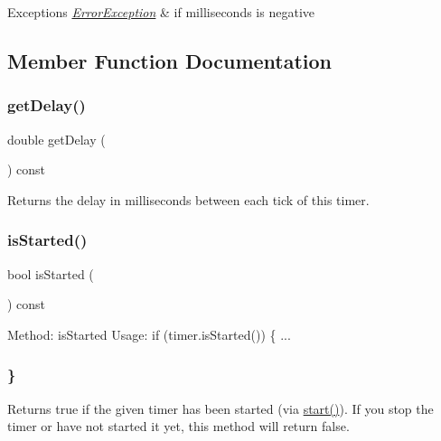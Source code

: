 \begin{DoxyExceptions}{Exceptions}
{\em \mbox{\hyperlink{classErrorException}{Error\+Exception}}} & if milliseconds is negative \\
\hline
\end{DoxyExceptions}


\subsection{Member Function Documentation}
\mbox{\label{classGTimer_a73d6fbcedb3f4c8379a76161503dc8f8}} 
\subsubsection{\texorpdfstring{get\+Delay()}{getDelay()}}
{\footnotesize\ttfamily double get\+Delay (\begin{DoxyParamCaption}{ }\end{DoxyParamCaption}) const}



Returns the delay in milliseconds between each tick of this timer. 

\mbox{\label{classGTimer_ac1991ea0e286fbb461b60c8c9299d781}} 
\subsubsection{\texorpdfstring{is\+Started()}{isStarted()}}
{\footnotesize\ttfamily bool is\+Started (\begin{DoxyParamCaption}{ }\end{DoxyParamCaption}) const}



Method\+: is\+Started Usage\+: if (timer.\+is\+Started()) \{ ... 

\subsubsection*{\} }

Returns true if the given timer has been started (via \mbox{\hyperlink{classGTimer_a60de64d75454385b23995437f1d72669}{start()}}). If you stop the timer or have not started it yet, this method will return false. \mbox{\label{classGTimer_a22ee094ca3f45aa4156b97d34fe678bf}} 
